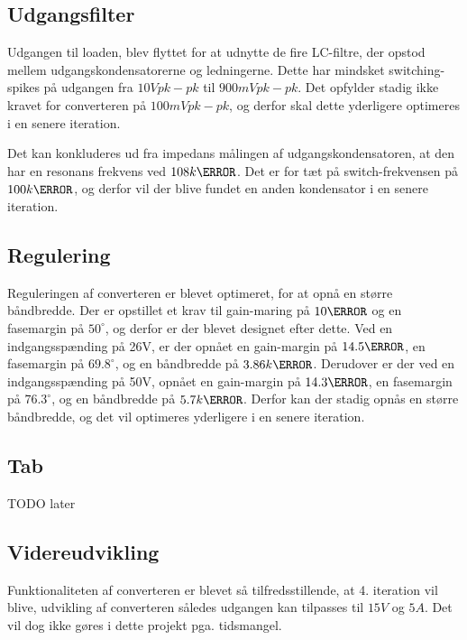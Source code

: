 \subsection{Udgangsfilter}
Udgangen til loaden, blev flyttet for at udnytte de fire LC-filtre, der opstod mellem udgangskondensatorerne og ledningerne. Dette har mindsket switching-spikes på udgangen fra $10Vpk-pk$ til $900mVpk-pk$. Det opfylder stadig ikke kravet for converteren på $100mVpk-pk$, og derfor skal dette yderligere optimeres i en senere iteration. 

Det kan konkluderes ud fra impedans målingen af udgangskondensatoren, at den har en resonans frekvens ved $108k\hertz$. Det er for tæt på switch-frekvensen på $100k\hertz$, og derfor vil der blive fundet en anden kondensator i en senere iteration.



\subsection{Regulering}
Reguleringen af converteren er blevet optimeret, for at opnå en større båndbredde. Der er opstillet et krav til gain-maring på $10\decibel$ og en fasemargin på $50^\circ$, og derfor er der blevet designet efter dette. Ved en indgangsspænding på 26V, er der opnået en gain-margin på $14.5\decibel$, en fasemargin på $69.8^\circ$, og en båndbredde på $3.86k\hertz$. Derudover er der ved en indgangsspænding på 50V, opnået en gain-margin på $14.3\decibel$, en fasemargin på $76.3^\circ$, og en båndbredde på $5.7k\hertz$. Derfor kan der stadig opnås en større båndbredde, og det vil optimeres yderligere i en senere iteration.


\subsection{Tab}
TODO later


\subsection{Videreudvikling}
Funktionaliteten af converteren er blevet så tilfredsstillende, at 4. iteration vil blive, udvikling af converteren således udgangen kan tilpasses til $15V$ og $5A$. Det vil dog ikke gøres i dette projekt pga. tidsmangel. 





